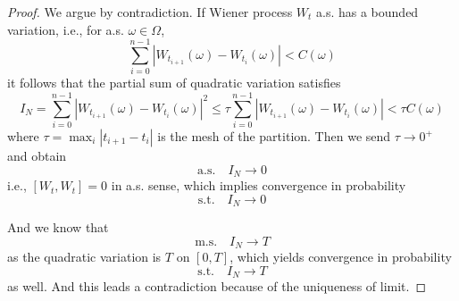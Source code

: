 \newcommand{\var}{\mathrm{Var}}
\newcommand{\cov}{\mathrm{Cov}}

    \problem
    \begin{proof}
        We argue by contradiction. If Wiener process
        $W_t$ a.s. has a bounded variation, i.e.,
        for a.s. $\omega\in\Omega$,
        \[\sum_{i=0}^{n-1}
        |W_{t_{i+1}}(\omega)-W_{t_i}(\omega)|<C(\omega)\]
        it follows that the partial sum of quadratic variation
        satisfies
        \[I_N=\sum_{i=0}^{n-1}
        |W_{t_{i+1}}(\omega)-W_{t_i}(\omega)|^2\leq
        \tau\sum_{i=0}^{n-1}|W_{t_{i+1}}(\omega)-W_{t_i}(\omega)|
        <\tau C(\omega)\]
        where $\tau=\max_i|t_{i+1}-t_i|$ is the mesh of the
        partition.
        Then we send $\tau\to 0^+$ and obtain
        \[\text{a.s.}\quad I_N\to 0\]
        i.e., $[W_t,W_t]=0$ in a.s. sense, which implies
        convergence in probability
        \[\text{s.t.}\quad I_N\to 0\]
        
        And we know that
        \[\text{m.s.}\quad I_N\to T\]
        as the quadratic variation is $T$ on $[0,T]$,
        which yields convergence in probability
        \[\text{s.t.}\quad I_N\to T\]
        as well. And this leads a contradiction because of the
        uniqueness of limit.
    \end{proof}

    \skipproblem

